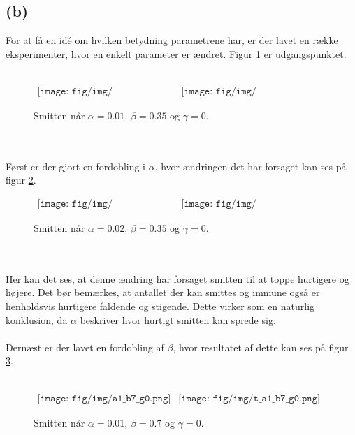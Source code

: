 \newpage
\subsection*{(b) }
% 
For at få en idé om hvilken betydning parametrene har, er der lavet en række eksperimenter, hvor en enkelt parameter er ændret.
Figur \ref{fig:a1_b35_g0} er udgangspunktet.\\\\
%
\begin{figure}[!ht]
\centering
$
\begin{matrix}
\texttt{[image: fig/img/a1\_b35\_g0.png]}&
\texttt{[image: fig/img/t\_a1\_b35\_g0.png]}
\end{matrix}
$
\caption{Smitten når $\alpha = 0.01$, $\beta = 0.35$ og $\gamma = 0$.}
\label{fig:a1_b35_g0}
\end{figure}\\\\
%
Først er der gjort en fordobling i $\alpha$, hvor ændringen det har forsaget kan ses på figur \ref{fig:a2_b35_g0}.
%
\begin{figure}[!ht]
\centering
$
\begin{matrix}
\texttt{[image: fig/img/a2\_b35\_g0.png]}&
\texttt{[image: fig/img/t\_a2\_b35\_g0.png]}
\end{matrix}
$
\caption{Smitten når $\alpha = 0.02$, $\beta = 0.35$ og $\gamma = 0$.}
\label{fig:a2_b35_g0}
\end{figure}\\\\
%
Her kan det ses, at denne ændring har forsaget smitten til at toppe hurtigere og højere.
Det bør bemærkes, at antallet der kan smittes og immune også er henholdsvis hurtigere faldende og stigende.
Dette virker som en naturlig konklusion, da $\alpha$ beskriver hvor hurtigt smitten kan sprede sig.\\\\
%
Dernæst er der lavet en fordobling af $\beta$, hvor resultatet af dette kan ses på figur \ref{fig:a1_b7_g0}.\\\\
%
\begin{figure}[!ht]
\centering
$
\begin{matrix}
\texttt{[image: fig/img/a1\_b7\_g0.png]}&
\texttt{[image: fig/img/t\_a1\_b7\_g0.png]}
\end{matrix}
$
\caption{Smitten når $\alpha = 0.01$, $\beta = 0.7$ og $\gamma = 0$.}
\label{fig:a1_b7_g0}
\end{figure}\\\\
